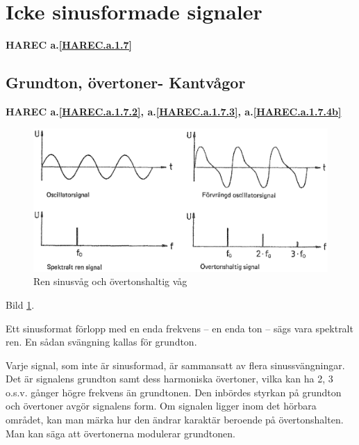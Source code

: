 \section{Icke sinusformade signaler}
\textbf{HAREC a.\ref{HAREC.a.1.7}\label{myHAREC.a.1.7}}

\subsection{Grundton, övertoner- Kantvågor}
\textbf{HAREC a.\ref{HAREC.a.1.7.2}, a.\ref{HAREC.a.1.7.3}, a.\ref{HAREC.a.1.7.4b}\label{myHAREC.a.1.7.2}\label{myHAREC.a.1.7.3}\label{myHAREC.a.1.7.4b}}

\begin{figure}
\begin{center}
\includegraphics[width=\textwidth]{images/cropped_pdfs/bild_2_1-18.pdf}
\caption{Ren sinusvåg och övertonshaltig våg}
\label{fig:BildII1-18}
\end{center}
\end{figure}

Bild \ref{fig:BildII1-18}.

Ett sinusformat förlopp med en enda frekvens -- en enda ton -- sägs vara
spektralt ren. En sådan svängning kallas för grundton.

Varje signal, som inte är sinusformad, är sammansatt av flera sinussvängningar.
Det är signalens grundton samt dess harmoniska övertoner, vilka kan ha 2, 3
o.s.v. gånger högre frekvens än grundtonen. Den inbördes styrkan på grundton
och övertoner avgör signalens form. Om signalen ligger inom det hörbara
området, kan man märka hur den ändrar karaktär beroende på övertonshalten. Man
kan säga att övertonerna modulerar grundtonen.


